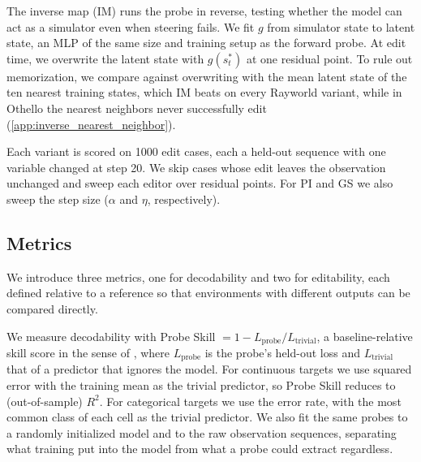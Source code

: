 \documentclass{article} %
\begin{document}
The inverse map (IM) runs the probe in reverse, testing whether the model can act as a simulator even when steering fails. We fit $g$ from simulator state to latent state, an MLP of the same size and training setup as the forward probe. At edit time, we overwrite the latent state with $g(s_t^*)$ at one residual point. To rule out memorization, we compare against overwriting with the mean latent state of the ten nearest training states, which IM beats on every Rayworld variant, while in Othello the nearest neighbors never successfully edit (\cref{app:inverse_nearest_neighbor}).

Each variant is scored on 1000 edit cases, each a held-out sequence with one variable changed at step 20. We skip cases whose edit leaves the observation unchanged and sweep each editor over residual points. For PI and GS we also sweep the step size ($\alpha$ and $\eta$, respectively).

\subsection{Metrics}
We introduce three metrics, one for decodability and two for editability, each defined relative to a reference so that environments with different outputs can be compared directly.

We measure decodability with Probe Skill $= 1 - L_{\mathrm{probe}} / L_{\mathrm{trivial}}$, a baseline-relative skill score in the sense of \citet{murphy1988skill}, where $L_{\mathrm{probe}}$ is the probe's held-out loss and $L_{\mathrm{trivial}}$ that of a predictor that ignores the model. For continuous targets we use squared error with the training mean as the trivial predictor, so Probe Skill reduces to (out-of-sample) $R^2$. For categorical targets we use the error rate, with the most common class of each cell as the trivial predictor. We also fit the same probes to a randomly initialized model \citep{li2023othello} and to the raw observation sequences, separating what training put into the model from what a probe could extract regardless.
\end{document}
